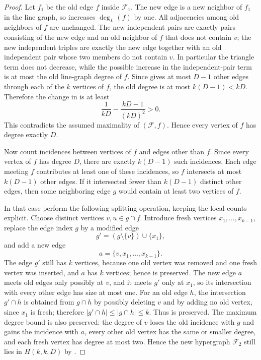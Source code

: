 \begin{proof}
Let $f_1$ be the old edge $f$ inside $\mathcal F_1$.  The new edge is a new
neighbor of $f_1$ in the line graph, so 
increases $\deg_L(f)$ by one.  All adjacencies among old neighbors of $f$
are unchanged.  The new independent pairs are exactly pairs consisting of
the new edge and an old neighbor of $f$ that does not contain $v$; the new
independent triples are exactly the new edge together with an old independent
pair whose two members do not contain $v$.  In particular the triangle term
does not decrease, while the possible increase in the independent-pair term
is at most the old line-graph degree of $f$.  Since
 gives at most $D-1$ other edges through each of
the $k$ vertices of $f$, the old degree is at most $k(D-1)<kD$.  Therefore
the change in  is at least
\[
\frac1{kD}-\frac{kD-1}{(kD)^2}>0.
\]
This contradicts the assumed maximality of $(\mathcal F,f)$.  Hence every
vertex of $f$ has degree exactly $D$.

Now count incidences between vertices of $f$ and edges other than $f$.  Since
every vertex of $f$ has degree $D$, there are exactly $k(D-1)$ such
incidences.  Each edge meeting $f$ contributes at least one of these
incidences, so $f$ intersects at most $k(D-1)$ other edges.  If it
intersected fewer than $k(D-1)$ distinct other edges, then some neighboring
edge $g$ would contain at least two vertices of $f$.

In that case perform the following splitting operation, keeping the local
counts explicit.  Choose distinct vertices $v,u\in g\cap f$.  Introduce
fresh vertices
$x_1,\ldots,x_{k-1}$, replace the edge index $g$ by a modified edge
\[
  g'=(g\setminus\{v\})\cup\{x_1\},
\]
and add a new edge
\[
  a=\{v,x_1,\ldots,x_{k-1}\}.
\]
The edge $g'$ still has $k$ vertices, because one old vertex was removed and
one fresh vertex was inserted, and $a$ has $k$ vertices; hence
 is preserved.  The new edge $a$ meets old edges
only possibly at $v$, and it meets $g'$ only at $x_1$, so its intersection
with every other edge has size at most one.  For an old edge $h$, the
intersection $g'\cap h$ is obtained from $g\cap h$ by possibly deleting
$v$ and by adding no old vertex, since $x_1$ is fresh; therefore
$|g'\cap h|\le |g\cap h|\le k$.  Thus  is
preserved.  The maximum degree bound is also preserved: the degree of $v$
loses the old incidence with $g$ and gains the incidence with $a$, every
other old vertex has the same or smaller degree, and each fresh vertex has
degree at most two.  Hence the new hypergraph $\mathcal F_2$ still lies in
$H(k,k,D)$ by .


\end{proof}
